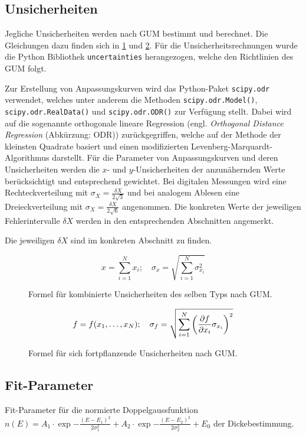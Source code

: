 \subsection{Unsicherheiten}\label{VGuD}

Jegliche Unsicherheiten werden nach GUM bestimmt und berechnet.
Die Gleichungen dazu finden sich in \cref{fig:GUM_combine} und \cref{fig:GUM_formula}.
Für die Unsicherheitsrechnungen wurde die Python Bibliothek \texttt{uncertainties} herangezogen, welche den Richtlinien des GUM folgt.

Zur Erstellung von Anpassungskurven wird das Python-Paket \texttt{scipy.odr} verwendet, welches unter anderem die Methoden \texttt{scipy.odr.Model()}, \texttt{scipy.odr.RealData()} und \texttt{scipy.odr.ODR()} zur Verfügung stellt.
Dabei wird auf die sogenannte orthogonale lineare Regression (engl. \emph{Orthogonal Distance Regression} (Abkürzung: ODR)) zurückgegriffen, welche auf der Methode der kleinsten Quadrate basiert und einen modifizierten Levenberg-Marquardt-Algorithmus darstellt.
Für die Parameter von Anpassungskurven und deren Unsicherheiten werden die $x$- und $y$-Unsicherheiten der anzunähernden Werte berücksichtigt und entsprechend gewichtet.
Bei digitalen Messungen wird eine Rechteckverteilung mit $\sigma_X = \frac{\delta X}{2\sqrt{3}}$ und bei analogem Ablesen eine Dreieckverteilung mit $\sigma_X = \frac{\delta X}{2\sqrt{6}}$ angenommen.
Die konkreten Werte der jeweiligen Fehlerintervalle $\delta X$ werden in den entsprechenden Abschnitten angemerkt.

Die jeweiligen $\delta X$ sind im konkreten Abschnitt zu finden.
\begin{figure}[ht]
	\begin{equation*}
		x = \sum_{i=1}^{N} x_i
		;\quad
		\sigma_x = \sqrt{\sum_{i = 1}^{N} \sigma_{x_i}^2}
	\end{equation*}
	\caption{Formel für kombinierte Unsicherheiten des selben Typs nach GUM.}
	\label{fig:GUM_combine}
\end{figure}

\begin{figure}[ht]
	\begin{align*}
		f = f(x_1, \dots , x_N)
		;\quad
		\sigma_f = \sqrt{\sum_{i = 1}^{N}\left(\pdv{f}{x_i} \sigma_{x_i}\right) ^2}
	\end{align*}
	\caption{Formel für sich fortpflanzende Unsicherheiten nach GUM.}
	\label{fig:GUM_formula}
\end{figure}

\subsection{Fit-Parameter}
\label{sec:fitval}

\begin{table}[H]
	\centering
	\caption{Fit-Parameter für die normierte Doppelgaussfunktion \mbox{$n(E) = A_1 \cdot \exp{-\frac{(E - E_1)^2}{2 \sigma_1^2}} + A_2 \cdot \exp{-\frac{(E - E_2)^2}{2 \sigma_2^2}} + E_0$} der Dickebestimmung.}
	\label{tab:fitval1}
	
\end{table}